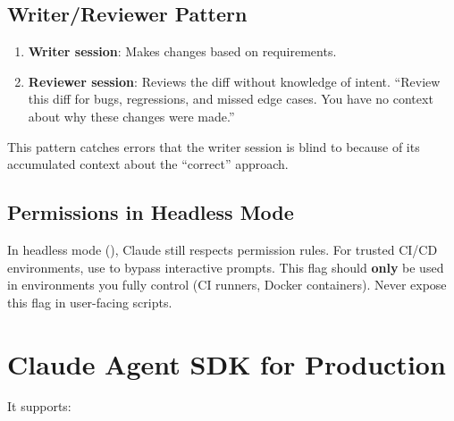 
\subsection{Writer/Reviewer Pattern}


\begin{enumerate}
  \item \textbf{Writer session}: Makes changes based on requirements.
  \item \textbf{Reviewer session}: Reviews the diff without knowledge of intent.
    ``Review this diff for bugs, regressions, and missed edge cases.
    You have no context about why these changes were made.''
\end{enumerate}

This pattern catches errors that the writer session is blind to
because of its accumulated context about the ``correct'' approach.

\subsection{Permissions in Headless Mode}

\begin{warnbox}[Permissions in CI/CD]
In headless mode (), Claude still respects permission rules.
For trusted CI/CD environments, use 
to bypass interactive prompts. This flag should \textbf{only} be used in
environments you fully control (CI runners, Docker containers).
Never expose this flag in user-facing scripts.
\end{warnbox}

\section{Claude Agent SDK for Production}
\label{sec:agent-sdk}


 It supports:

